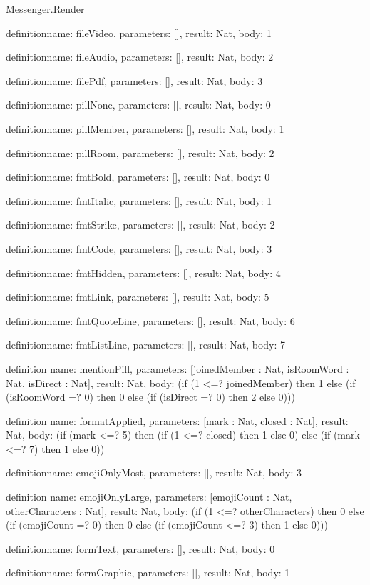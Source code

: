 \begin{lexlean}{Messenger.Render}
\begin{semanticmodule}
definition{name: fileVideo, parameters: [], result: Nat, body: 1}

definition{name: fileAudio, parameters: [], result: Nat, body: 2}

definition{name: filePdf, parameters: [], result: Nat, body: 3}

definition{name: pillNone, parameters: [], result: Nat, body: 0}

definition{name: pillMember, parameters: [], result: Nat, body: 1}

definition{name: pillRoom, parameters: [], result: Nat, body: 2}

definition{name: fmtBold, parameters: [], result: Nat, body: 0}

definition{name: fmtItalic, parameters: [], result: Nat, body: 1}

definition{name: fmtStrike, parameters: [], result: Nat, body: 2}

definition{name: fmtCode, parameters: [], result: Nat, body: 3}

definition{name: fmtHidden, parameters: [], result: Nat, body: 4}

definition{name: fmtLink, parameters: [], result: Nat, body: 5}

definition{name: fmtQuoteLine, parameters: [], result: Nat, body: 6}

definition{name: fmtListLine, parameters: [], result: Nat, body: 7}

definition{
  name: mentionPill,
  parameters: [joinedMember : Nat, isRoomWord : Nat, isDirect : Nat],
  result: Nat,
  body: (if (1 <=? joinedMember) then 1 else (if (isRoomWord =? 0) then 0 else (if (isDirect =? 0) then 2 else 0)))
}

definition{
  name: formatApplied,
  parameters: [mark : Nat, closed : Nat],
  result: Nat,
  body: (if (mark <=? 5) then (if (1 <=? closed) then 1 else 0) else (if (mark <=? 7) then 1 else 0))
}

definition{name: emojiOnlyMost, parameters: [], result: Nat, body: 3}

definition{
  name: emojiOnlyLarge,
  parameters: [emojiCount : Nat, otherCharacters : Nat],
  result: Nat,
  body: (if (1 <=? otherCharacters) then 0 else (if (emojiCount =? 0) then 0 else (if (emojiCount <=? 3) then 1 else 0)))
}

definition{name: formText, parameters: [], result: Nat, body: 0}

definition{name: formGraphic, parameters: [], result: Nat, body: 1}


\end{semanticmodule}
\end{lexlean}

